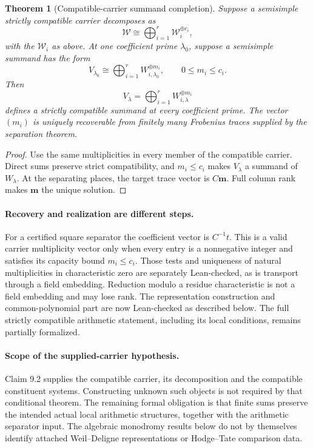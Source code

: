 \documentclass[11pt]{article}
\newtheorem{theorem}{Theorem}[section]
\theoremstyle{definition}
\theoremstyle{remark}
\begin{document}
\begin{theorem}[Compatible-carrier summand completion]\label{px:9.2}
Suppose a semisimple strictly compatible carrier decomposes as
\[
\mathscr W
\cong
\bigoplus_{i=1}^{r}
\mathscr W_i^{\oplus c_i},
\]
with the \(\mathscr W_i\) as above.  At one coefficient prime \(\lambda_0\), suppose a semisimple summand has the form
\[
V_{\lambda_0}
\cong
\bigoplus_{i=1}^{r}
W_{i,\lambda_0}^{\oplus m_i},
\qquad
0\le m_i\le c_i.
\]
Then
\[
\boxed{
V_\lambda
=
\bigoplus_{i=1}^{r}
W_{i,\lambda}^{\oplus m_i}
}
\]
defines a strictly compatible summand at every coefficient prime.  The vector \((m_i)\) is uniquely recoverable from finitely many Frobenius traces supplied by the separation theorem.
\end{theorem}

\begin{proof}
Use the same multiplicities in every member of the compatible carrier.  Direct sums preserve strict compatibility, and \(m_i\le c_i\) makes \(V_\lambda\) a summand of \(W_\lambda\).  At the separating places, the target trace vector is \(C\bm m\).  Full column rank makes \(\bm m\) the unique solution.
\end{proof}

\paragraph{Recovery and realization are different steps.}
For a certified square separator the coefficient vector is $C^{-1}t$.
This is a valid carrier multiplicity vector only when every entry is a
nonnegative integer and satisfies its capacity bound $m_i\le c_i$.
Those tests and uniqueness of natural multiplicities in characteristic zero
are separately Lean-checked, as is transport through a field embedding.
Reduction modulo a residue characteristic is not a field embedding and may
lose rank. The representation construction and common-polynomial part are now
Lean-checked as described below. The full strictly compatible arithmetic
statement, including its local conditions, remains partially formalized.

\paragraph{Scope of the supplied-carrier hypothesis.}
Claim 9.2 supplies the compatible carrier, its decomposition and the compatible
constituent systems. Constructing unknown such objects is not required by that
conditional theorem. The remaining formal obligation is that finite sums preserve
the intended actual local arithmetic structures, together with the arithmetic
separator input. The algebraic monodromy results below do not by themselves
identify attached Weil--Deligne representations or Hodge--Tate comparison data.
\end{document}
